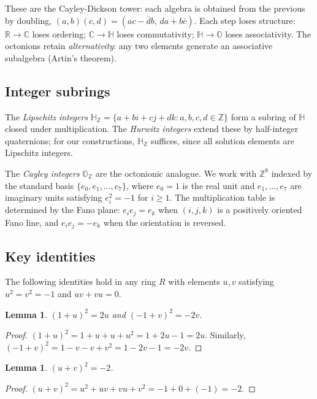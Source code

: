 \documentclass[11pt]{amsart}
\theoremstyle{plain}
\newtheorem{lemma}[theorem]{Lemma}
\theoremstyle{definition}
\theoremstyle{remark}
\newcommand{\Z}{\mathbb{Z}}
\newcommand{\R}{\mathbb{R}}
\newcommand{\C}{\mathbb{C}}
\newcommand{\HH}{\mathbb{H}}
\newcommand{\OO}{\mathbb{O}}
\begin{document}
These are the Cayley-Dickson tower: each algebra is obtained from the previous
by doubling, $(a, b)(c, d) = (ac - \bar{d}b, \, da + b\bar{c})$.
Each step loses structure:
$\R \to \C$ loses ordering;
$\C \to \HH$ loses commutativity;
$\HH \to \OO$ loses associativity.
The octonions retain \emph{alternativity}: any two elements generate an
associative subalgebra (Artin's theorem).

\subsection{Integer subrings}

The \emph{Lipschitz integers} $\HH_\Z = \{a + bi + cj + dk : a, b, c, d \in \Z\}$
form a subring of $\HH$ closed under multiplication.
The \emph{Hurwitz integers} extend these by half-integer quaternions; for our constructions,
$\HH_\Z$ suffices, since all solution elements are Lipschitz integers.

The \emph{Cayley integers} $\OO_\Z$ are the octonionic analogue.
We work with $\Z^8$ indexed by the standard basis $\{e_0, e_1, \ldots, e_7\}$,
where $e_0 = 1$ is the real unit and $e_1, \ldots, e_7$ are imaginary units satisfying
$e_i^2 = -1$ for $i \geq 1$.
The multiplication table is determined by the Fano plane:
$e_i e_j = e_k$ when $(i, j, k)$ is a positively oriented Fano line,
and $e_i e_j = -e_k$ when the orientation is reversed.

\subsection{Key identities}

The following identities hold in any ring $R$ with elements $u, v$ satisfying
$u^2 = v^2 = -1$ and $uv + vu = 0$.

\begin{lemma}\label{lem:squares}
$(1+u)^2 = 2u$ and $(-1+v)^2 = -2v$.
\end{lemma}

\begin{proof}
$(1+u)^2 = 1 + u + u + u^2 = 1 + 2u - 1 = 2u$.
Similarly, $(-1+v)^2 = 1 - v - v + v^2 = 1 - 2v - 1 = -2v$.
\end{proof}

\begin{lemma}\label{lem:sumsq}
$(u+v)^2 = -2$.
\end{lemma}

\begin{proof}
$(u+v)^2 = u^2 + uv + vu + v^2 = -1 + 0 + (-1) = -2$.
\end{proof}
\end{document}
